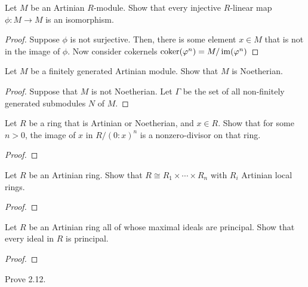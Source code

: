 \newpage
\begin{problem}
Let $M$ be an Artinian $R$-module. Show that every injective
$R$-linear map $\phi\colon M\to M$ is an isomorphism.
\end{problem}
\begin{proof}
Suppose $\phi$ is not surjective. Then, there is some element
$x\in M$ that is not in the image of $\phi$. Now consider
cokernels $\operatorname*{coker}(\varphi^n)=M/\operatorname{im}(\varphi^n)$
\end{proof}
\newpage
\begin{problem}
Let $M$ be a finitely generated Artinian module. Show that $M$ is
Noetherian.
\end{problem}
\begin{proof}
Suppose that $M$ is not Noetherian. Let $\Gamma$ be the set of
all non-finitely generated submodules $N$ of $M$.
\end{proof}
\newpage
\begin{problem}
Let $R$ be a ring that is Artinian or Noetherian, and $x\in
R$. Show that for some $n>0$, the image of $x$ in $R/(0:x)^n$ is
a nonzero-divisor on that ring.
\end{problem}
\begin{proof}
\end{proof}
\newpage
\begin{problem}
Let $R$ be an Artinian ring. Show that $R\cong
R_1\times\cdots\times R_n$ with $R_i$ Artinian local rings.
\end{problem}
\begin{proof}
\end{proof}
\newpage
\begin{problem}
Let $R$ be an Artinian ring all of whose maximal ideals are
principal. Show that every ideal in $R$ is principal.
\end{problem}
\begin{proof}
\end{proof}
\newpage
\begin{problem}
Prove 2.12.
\end{problem}
